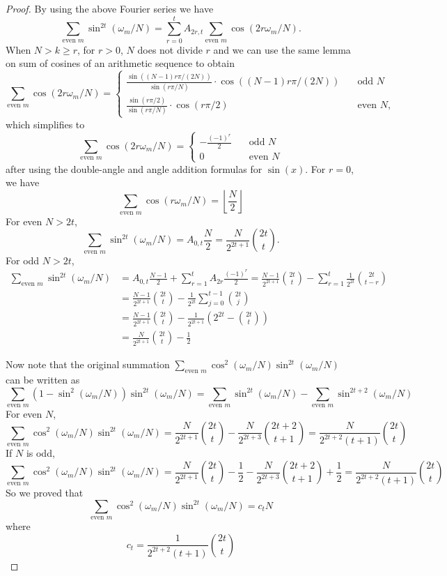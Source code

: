 \documentclass[12pt]{article}
\theoremstyle{definition}
\begin{document}
\begin{proof}
By using the above Fourier series we have 
\[\sum_{\text{even } m} \sin^{2t}\left(\omega_m/N\right) =\sum_{r= 0 }^t A_{2r,t} \sum_{\text{even } m} \cos\left(2r\omega_m/N\right). \]
When $N>k\geq r$, for $r>0$, $N$ does not divide $r$ and we can use the same lemma on sum of cosines of an arithmetic sequence to obtain
\[
\sum_{\text{even } m} \cos\left(2r\omega_m/N\right) = 
\begin{cases}
    \frac{\sin\left((N-1)r\pi/(2N)\right)}{\sin\left(r\pi/N\right)}\cdot\cos\left((N-1)r\pi/(2N)\right) \quad & \text{odd } N\\
    \frac{\sin\left(r\pi/2\right)}{\sin\left(r\pi/N\right)}\cdot\cos\left(r\pi/2\right) \quad & \text{even } N,
\end{cases}
\]
which simplifies to 
\[
\sum_{\text{even } m} \cos\left(2r\omega_m/N\right) = 
\begin{cases}
    -\frac{(-1)^{r}}{2} \quad & \text{odd } N\\
    0 \quad & \text{even } N
\end{cases}
\]
after using the double-angle and angle addition formulas for $\sin(x)$. For $r = 0$, we have \[
\sum_{\text{even } m} \cos\left(r\omega_m/N\right) = \left\lfloor\frac{N}{2}\right\rfloor
\]
For even $N>2t$,
\[
\sum_{\text{even } m} \sin^{2t}\left(\omega_m/N\right) = A_{0,t}\frac{N}{2} =  \frac{N}{2^{2t+1}}\binom{2t}{t}.
\]
For odd $N>2t$,
\begin{align*}
\sum_{\text{even } m} \sin^{2t}\left(\omega_m/N\right) &= A_{0,t}\frac{N-1}{2} + \sum_{r=1}^{t} A_{2r}\frac{(-1)^{r}}{2} =  \frac{N-1}{2^{2t+1}}\binom{2t}{t} - \sum_{r=1}^{t} \frac{1}{2^{2t}} \binom{2t}{t-r}\\
&= \frac{N-1}{2^{2t+1}}\binom{2t}{t} - \frac{1}{2^{2t}}\sum_{j = 0 }^{t-1}  \binom{2t}{j}\\
&= \frac{N-1}{2^{2t+1}}\binom{2t}{t} - \frac{1}{2^{2t+1}}\left(2^{2t}-\binom{2t}{t}\right)\\
&= \frac{N}{2^{2t+1}}\binom{2t}{t} -\frac{1}{2}
\end{align*}

Now note that the original summation
\(
\sum_{\text{even }m}\cos^2\left(\omega_m/N\right)\sin^{2t}\left(\omega_m/N\right)
\)
can be written as 
\[
\sum_{\text{even }m}\left(1-\sin^2\left(\omega_m/N\right)\right)\sin^{2t}\left(\omega_m/N\right)
= \sum_{\text{even }m}\sin^{2t}\left(\omega_m/N\right) - 
\sum_{\text{even }m}\sin^{2t+2}\left(\omega_m/N\right)
\] 
For even $N$,
\[
\sum_{\text{even }m}\cos^2\left(\omega_m/N\right)\sin^{2t}\left(\omega_m/N\right) = \frac{N}{2^{2t+1}}\binom{2t}{t} - \frac{N}{2^{2t+3}}\binom{2t+2}{t+1} = \frac{N}{2^{2t+2}(t+1)} \binom{2t}{t}
\]
If $N$ is odd,
\[
\sum_{\text{even }m}\cos^2\left(\omega_m/N\right)\sin^{2t}\left(\omega_m/N\right) = \frac{N}{2^{2t+1}}\binom{2t}{t}-\frac{1}{2} - \frac{N}{2^{2t+3}}\binom{2t+2}{t+1}+\frac{1}{2} = \frac{N}{2^{2t+2}(t+1)} \binom{2t}{t}
\]
So we proved that
\[
\sum_{\text{even }m}\cos^2\left(\omega_m/N\right)\sin^{2t}\left(\omega_m/N\right) = c_t N
\]
where
\[
c_t = \frac{1}{2^{2t+2}(t+1)} \binom{2t}{t}
\]


\end{proof}
\end{document}
